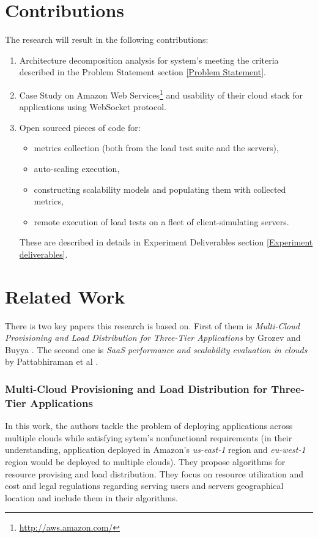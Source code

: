 \documentclass{uvamscse}
\begin{document}
\section{Contributions}
The research will result in the following contributions:

\begin{enumerate}
  \item Architecture decomposition analysis for system's meeting the criteria described in the Problem Statement section \ref{Problem Statement}.
  \item Case Study on Amazon Web Services\footnote{\url{http://aws.amazon.com/}} and usability of their cloud stack for applications using WebSocket protocol.
  \item Open sourced pieces of code for:
  \begin{itemize}
    \item metrics collection (both from the load test suite and the servers),
    \item auto-scaling execution,
    \item constructing scalability models and populating them with collected metrics,
    \item remote execution of load tests on a fleet of client-simulating servers.
  \end{itemize}
  These are described in details in Experiment Deliverables section \ref{Experiment deliverables}.
\end{enumerate}

\section{Related Work}\label{Related Work}

There is two key papers this research is based on. First of them is \textit{Multi-Cloud Provisioning and Load Distribution for Three-Tier Applications} by Grozev and Buyya \cite{GroBuy}. The second one is \textit{SaaS performance and scalability evaluation in clouds} by Pattabhiraman et al \cite{Models}.

\subsubsection{Multi-Cloud Provisioning and Load Distribution for Three-Tier Applications}

In this work, the authors tackle the problem of deploying applications across multiple clouds while satisfying sytem's nonfunctional requirements (in their understanding, application deployed in Amazon's \textit{us-east-1} region and \textit{eu-west-1} region would be deployed to multiple clouds). They propose algorithms for resource provising and load distribution. They focus on resource utilization and cost and legal regulations regarding serving users and servers geographical location and include them in their algorithms.
\end{document}
